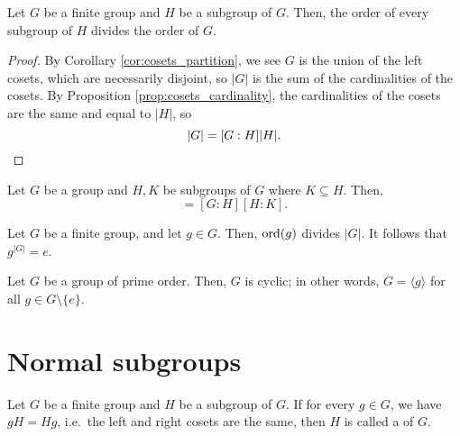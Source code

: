 \begin{thm}
Let $ G $ be a finite group and $ H $ be a subgroup of $ G $. Then, the order of every subgroup of $ H $ divides the order of $ G $.
\end{thm}
\begin{proof}
By Corollary \ref{cor:cosets_partition}, we see $ G $ is the union of the left cosets, which are necessarily disjoint, so $ \lvert G\rvert $ is the sum of the cardinalities of the cosets. By Proposition \ref{prop:cosets_cardinality}, the cardinalities of the cosets are the same and equal to $ \lvert H\rvert $, so
\begin{equation*}
    \lvert G\rvert=[G:H]\lvert H\rvert. \qedhere
\end{equation*}
\end{proof}

\begin{cor}
Let $ G $ be a group and $ H,K $ be subgroups of $ G $ where $ K\subseteq H $. Then,
\begin{equation*}
    [G:K]=[G:H][H:K].
\end{equation*}
\end{cor}

\begin{cor}
Let $ G $ be a finite group, and let $ g\in G $. Then, $ \operatorname{ord}(g) $ divides $ \lvert G\rvert $. It follows that $ g^{\lvert G\rvert}=e $.
\end{cor}

\begin{cor}
Let $ G $ be a group of prime order. Then, $ G $ is cyclic; in other words, $ G=\langle g\rangle $ for all $ g\in G\setminus\{e\} $.
\end{cor}

\section{Normal subgroups}

\begin{defn}
Let $ G $ be a finite group and $ H $ be a subgroup of $ G $. If for every $ g\in G $, we have $ gH=Hg $, i.e.\ the left and right cosets are the same, then $ H $ is called a  of $ G $.
\end{defn}

